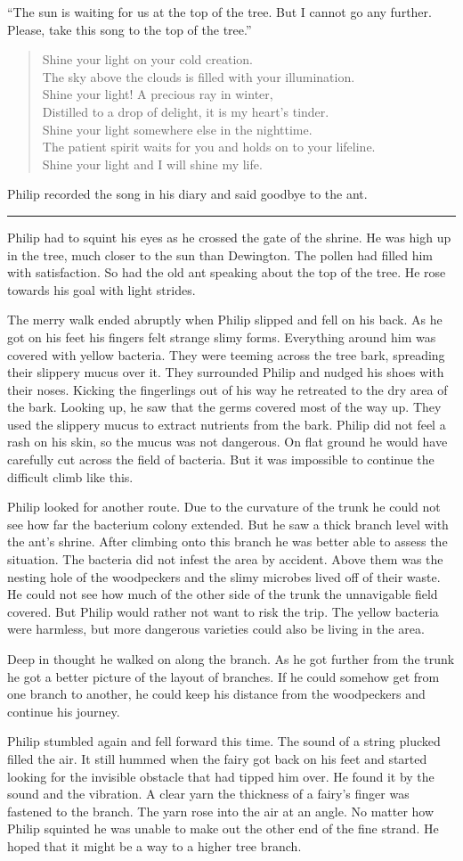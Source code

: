 \documentclass[10pt, draft]{memoir}
\renewcommand{\pfbreakdisplay}{\bigskip \ding{166} \bigskip}
\newcommand{\secbreak}{\fancybreak{\pfbreakdisplay}}
\newcommand{\sunsong}{
  Shine your light on your cold creation. \\
  The sky above the clouds is filled with your illumination. \\
  Shine your light! A precious ray in winter, \\
  Distilled to a drop of delight, it is my heart's tinder. \\
  Shine your light somewhere else in the nighttime. \\
  The patient spirit waits for you and holds on to your lifeline. \\
  Shine your light and I will shine my life.
}
\begin{document}
``The sun is waiting for us at the top of the tree. But I cannot go any further. Please, take this song to the top of the tree.”


\begin{verse}
\sunsong
\end{verse}


Philip recorded the song in his diary and said goodbye to the ant.

\secbreak

Philip had to squint his eyes as he crossed the gate of the shrine. He was high up in the tree, much closer to the sun than Dewington. The pollen had filled him with satisfaction. So had the old ant speaking about the top of the tree. He rose towards his goal with light strides.

The merry walk ended abruptly when Philip slipped and fell on his back. As he got on his feet his fingers felt strange slimy forms. Everything around him was covered with yellow bacteria. They were teeming across the tree bark, spreading their slippery mucus over it. They surrounded Philip and nudged his shoes with their noses. Kicking the fingerlings out of his way he retreated to the dry area of the bark. Looking up, he saw that the germs covered most of the way up. They used the slippery mucus to extract nutrients from the bark. Philip did not feel a rash on his skin, so the mucus was not dangerous. On flat ground he would have carefully cut across the field of bacteria. But it was impossible to continue the difficult climb like this.

Philip looked for another route. Due to the curvature of the trunk he could not see how far the bacterium colony extended. But he saw a thick branch level with the ant's shrine. After climbing onto this branch he was better able to assess the situation. The bacteria did not infest the area by accident. Above them was the nesting hole of the woodpeckers and the slimy microbes lived off of their waste. He could not see how much of the other side of the trunk the unnavigable field covered. But Philip would rather not want to risk the trip. The yellow bacteria were harmless, but more dangerous varieties could also be living in the area.

Deep in thought he walked on along the branch. As he got further from the trunk he got a better picture of the layout of branches. If he could somehow get from one branch to another, he could keep his distance from the woodpeckers and continue his journey.

Philip stumbled again and fell forward this time. The sound of a string plucked filled the air. It still hummed when the fairy got back on his feet and started looking for the invisible obstacle that had tipped him over. He found it by the sound and the vibration. A clear yarn the thickness of a fairy's finger was fastened to the branch. The yarn rose into the air at an angle. No matter how Philip squinted he was unable to make out the other end of the fine strand. He hoped that it might be a way to a higher tree branch.
\end{document}
